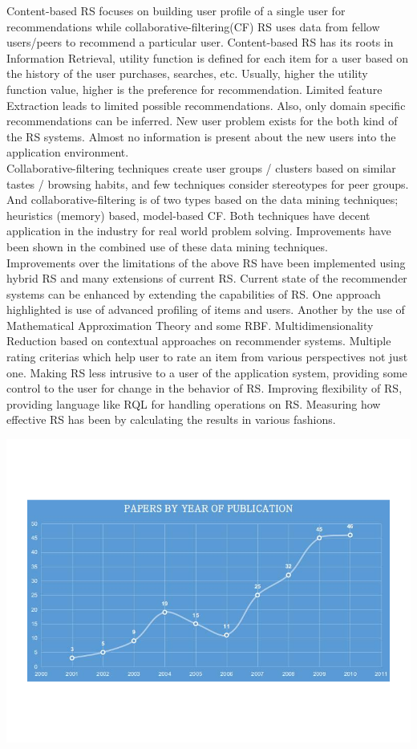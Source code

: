 \documentclass[12pt,a4paper]{article}
\begin{document}
Content-based RS focuses on building user profile of a single user for recommendations while collaborative-filtering(CF) RS uses data from fellow users/peers to recommend a particular user. Content-based RS has its roots in Information Retrieval, utility function is defined for each item for a user based on the history of the user purchases, searches, etc. Usually, higher the utility function value, higher is the preference for recommendation. Limited feature Extraction leads to limited possible recommendations. Also, only domain specific recommendations can be inferred. New user problem exists for the both kind of the RS systems. Almost no information is present about the new users into the application environment.\\

Collaborative-filtering techniques create user groups / clusters based on similar tastes / browsing habits, and few techniques consider stereotypes for peer groups. And collaborative-filtering is of two types based on the data mining techniques; heuristics (memory) based, model-based CF. Both techniques have decent application in the industry for real world problem solving. Improvements have been shown in the combined use of these data mining techniques.\\

Improvements over the limitations of the above RS have been implemented using hybrid RS and many extensions of current RS. Current state of the recommender systems can be enhanced by extending the capabilities of RS. One approach highlighted is use of advanced profiling of items and users. Another by the use of Mathematical Approximation Theory and some RBF. Multidimensionality Reduction based on contextual approaches on recommender systems. Multiple rating criterias which help user to rate an item from various perspectives not just one. Making RS less intrusive to a user of the application system, providing some control to the user for change in the
behavior of RS. Improving flexibility of RS, providing language like RQL for handling operations on RS. Measuring how effective RS has been by calculating the results in various fashions.

\includegraphics[width=\linewidth]{images/Untitled}\\
\end{document}
